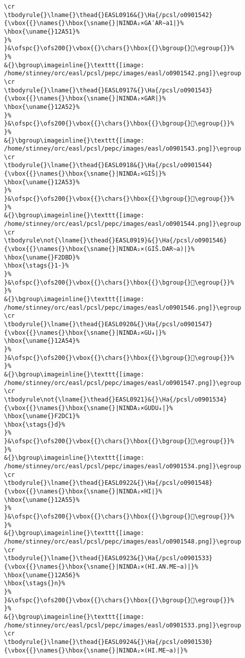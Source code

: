 \begin{verbatim}
\cr
\tbodyrule{}\lname{}\thead{}EASL0916&{}\Ha{/pcsl/o0901542}{\vbox{{}\names{}\hbox{\sname{}|NINDA₂×GAʾAR∼a1|}%
\hbox{\uname{}12A51}%
}%
}&\ofspc{}\ofs200{}\vbox{{}\chars{}\hbox{{}\bgroup{}𒩑\egroup{}}%
}%
&{}\bgroup\imageinline{}\texttt{[image: /home/stinney/orc/easl/pcsl/pepc/images/easl/o0901542.png]}\egroup
\cr
\tbodyrule{}\lname{}\thead{}EASL0917&{}\Ha{/pcsl/o0901543}{\vbox{{}\names{}\hbox{\sname{}|NINDA₂×GAR|}%
\hbox{\uname{}12A52}%
}%
}&\ofspc{}\ofs200{}\vbox{{}\chars{}\hbox{{}\bgroup{}𒩒\egroup{}}%
}%
&{}\bgroup\imageinline{}\texttt{[image: /home/stinney/orc/easl/pcsl/pepc/images/easl/o0901543.png]}\egroup
\cr
\tbodyrule{}\lname{}\thead{}EASL0918&{}\Ha{/pcsl/o0901544}{\vbox{{}\names{}\hbox{\sname{}|NINDA₂×GIŠ|}%
\hbox{\uname{}12A53}%
}%
}&\ofspc{}\ofs200{}\vbox{{}\chars{}\hbox{{}\bgroup{}𒩓\egroup{}}%
}%
&{}\bgroup\imageinline{}\texttt{[image: /home/stinney/orc/easl/pcsl/pepc/images/easl/o0901544.png]}\egroup
\cr
\tbodyrule\not{\lname{}\thead{}EASL0919}&{}\Ha{/pcsl/o0901546}{\vbox{{}\names{}\hbox{\sname{}|NINDA₂×(GIŠ.DAR∼a)|}%
\hbox{\uname{}F2DBD}%
\hbox{\stags{}1-}%
}%
}&\ofspc{}\ofs200{}\vbox{{}\chars{}\hbox{{}\bgroup{}󲶽\egroup{}}%
}%
&{}\bgroup\imageinline{}\texttt{[image: /home/stinney/orc/easl/pcsl/pepc/images/easl/o0901546.png]}\egroup
\cr
\tbodyrule{}\lname{}\thead{}EASL0920&{}\Ha{/pcsl/o0901547}{\vbox{{}\names{}\hbox{\sname{}|NINDA₂×GU₄|}%
\hbox{\uname{}12A54}%
}%
}&\ofspc{}\ofs200{}\vbox{{}\chars{}\hbox{{}\bgroup{}𒩔\egroup{}}%
}%
&{}\bgroup\imageinline{}\texttt{[image: /home/stinney/orc/easl/pcsl/pepc/images/easl/o0901547.png]}\egroup
\cr
\tbodyrule\not{\lname{}\thead{}EASL0921}&{}\Ha{/pcsl/o0901534}{\vbox{{}\names{}\hbox{\sname{}|NINDA₂×GUDU₄|}%
\hbox{\uname{}F2DC1}%
\hbox{\stags{}d}%
}%
}&\ofspc{}\ofs200{}\vbox{{}\chars{}\hbox{{}\bgroup{}󲷁\egroup{}}%
}%
&{}\bgroup\imageinline{}\texttt{[image: /home/stinney/orc/easl/pcsl/pepc/images/easl/o0901534.png]}\egroup
\cr
\tbodyrule{}\lname{}\thead{}EASL0922&{}\Ha{/pcsl/o0901548}{\vbox{{}\names{}\hbox{\sname{}|NINDA₂×HI|}%
\hbox{\uname{}12A55}%
}%
}&\ofspc{}\ofs200{}\vbox{{}\chars{}\hbox{{}\bgroup{}𒩕\egroup{}}%
}%
&{}\bgroup\imageinline{}\texttt{[image: /home/stinney/orc/easl/pcsl/pepc/images/easl/o0901548.png]}\egroup
\cr
\tbodyrule{}\lname{}\thead{}EASL0923&{}\Ha{/pcsl/o0901533}{\vbox{{}\names{}\hbox{\sname{}|NINDA₂×(HI.AN.ME∼a)|}%
\hbox{\uname{}12A56}%
\hbox{\stags{}n}%
}%
}&\ofspc{}\ofs200{}\vbox{{}\chars{}\hbox{{}\bgroup{}𒩖\egroup{}}%
}%
&{}\bgroup\imageinline{}\texttt{[image: /home/stinney/orc/easl/pcsl/pepc/images/easl/o0901533.png]}\egroup
\cr
\tbodyrule{}\lname{}\thead{}EASL0924&{}\Ha{/pcsl/o0901530}{\vbox{{}\names{}\hbox{\sname{}|NINDA₂×(HI.ME∼a)|}%

\end{verbatim}
